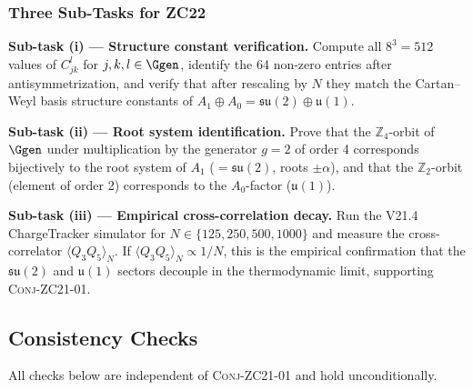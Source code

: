 \documentclass[12pt, a4paper]{article}
\begin{document}
\subsubsection{Three Sub-Tasks for ZC22}

\begin{openqbox}[title={Sub-Tasks for Verification in ZC22}]
\textbf{Sub-task (i) — Structure constant verification.}
Compute all $8^3 = 512$ values of $C_{jk}^l$
for $j,k,l \in \Ggen$, identify the 64 non-zero entries
after antisymmetrization,
and verify that after rescaling by $N$ they match the
Cartan--Weyl basis structure constants of
$A_1 \oplus A_0 = \mathfrak{su}(2)\oplus\mathfrak{u}(1)$.

\medskip\noindent
\textbf{Sub-task (ii) — Root system identification.}
Prove that the $\mathbb{Z}_4$-orbit of $\Ggen$
under multiplication by the generator $g=2$ of order 4
corresponds bijectively to the root system of $A_1$
($= \mathfrak{su}(2)$, roots $\pm\alpha$),
and that the $\mathbb{Z}_2$-orbit (element of order 2)
corresponds to the $A_0$-factor ($\mathfrak{u}(1)$).

\medskip\noindent
\textbf{Sub-task (iii) — Empirical cross-correlation decay.}
Run the V21.4 ChargeTracker simulator for
$N \in \{125, 250, 500, 1000\}$ and
measure the cross-correlator
$\langle Q_3 Q_5 \rangle_N$.
If $\langle Q_3 Q_5 \rangle_N \propto 1/N$,
this is the empirical confirmation that the
$\mathfrak{su}(2)$ and $\mathfrak{u}(1)$ sectors
decouple in the thermodynamic limit,
supporting \textsc{Conj-ZC21-01}.
\end{openqbox}

\subsection{Consistency Checks}
\label{zc21:sec:checks}

All checks below are independent of \textsc{Conj-ZC21-01}
and hold unconditionally.
\end{document}
